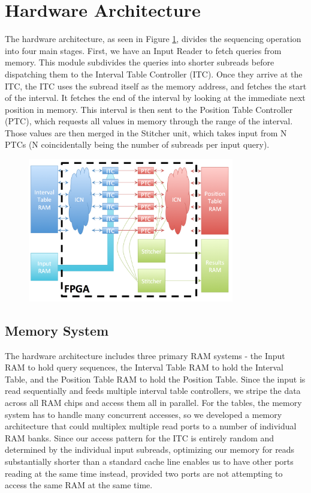\documentclass[11pt]{article}
\begin{document}
\section{Hardware Architecture}

The hardware architecture, as seen in Figure \ref{arch}, divides the sequencing operation into four main stages.  First, we have an Input Reader to fetch queries from memory.  This module subdivides the queries into shorter subreads before dispatching them to the Interval Table Controller (ITC).  Once they arrive at the ITC, the ITC uses the subread itself as the memory address, and fetches the start of the interval.  It fetches the end of the interval by looking at the immediate next position in memory.  This interval is then sent to the Position Table Controller (PTC), which requests all values in memory through the range of the interval.  Those values are then merged in the Stitcher unit, which takes input from N PTCs (N coincidentally being the number of subreads per input query).
\begin{figure}[ht!]
\centering
\includegraphics[width=90mm]{architecture.png}
\caption{}
\label{arch}
\end{figure}


\subsection{Memory System}
The hardware architecture includes three primary RAM systems - the Input RAM to hold query sequences, the Interval Table RAM to hold the Interval Table, and the Position Table RAM to hold the Position Table.  Since the input is read sequentially and feeds multiple interval table controllers, we  stripe the data across all RAM chips and access them all in parallel.  For the tables, the memory system has to handle many concurrent accesses, so we developed a memory architecture that could multiplex multiple read ports to a number of individual RAM banks.  Since our access pattern for the ITC is entirely random and determined by the individual input subreads, optimizing our memory for reads substantially shorter than a standard cache line enables us to have other ports reading at the same time instead, provided two ports are not attempting to access the same RAM at the same time.
\end{document}
